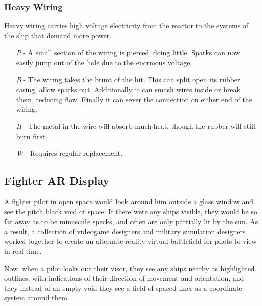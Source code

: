 \documentclass[a4paper]{article}
\begin{document}
\vspace{-0.5cm} \hspace{-18pt} \subsubsection{Heavy Wiring} \label{grid_heavy_wiring} \vspace{-0.2cm}
Heavy wiring carries high voltage electricity from the reactor to the systems of the ship that demand more power.
\begin{enumerate}
\item [\textit{P}] - A small section of the wiring is pierced, doing little. Sparks can now easily jump out of the hole due to the enormous voltage.
\item [\textit{B}] - The wiring takes the brunt of the hit. This can split open its rubber casing, allow sparks out. Additionally it can smash wires inside or break them, reducing flow. Finally it can sever the connection on either end of the wiring.
\item [\textit{H}] - The metal in the wire will absorb much heat, though the rubber will still burn first.
\item [\textit{W}] - Requires regular replacement.
\end{enumerate}


\subsection{Fighter AR Display} \label{fighter}

A fighter pilot in open space would look around him outside a glass window and see the pitch black void of space. If there were any ships visible, they would be so far away as to be minuscule specks, and often are only partially lit by the sun. As a result, a collection of videogame designers and military simulation designers worked together to create an alternate-reality virtual battlefield for pilots to view in real-time.

Now, when a pilot looks out their visor, they see any ships nearby as highlighted outlines, with indications of their direction of movement and orientation, and they instead of an empty void they see a field of spaced lines as a coordinate system around them.
\end{document}
